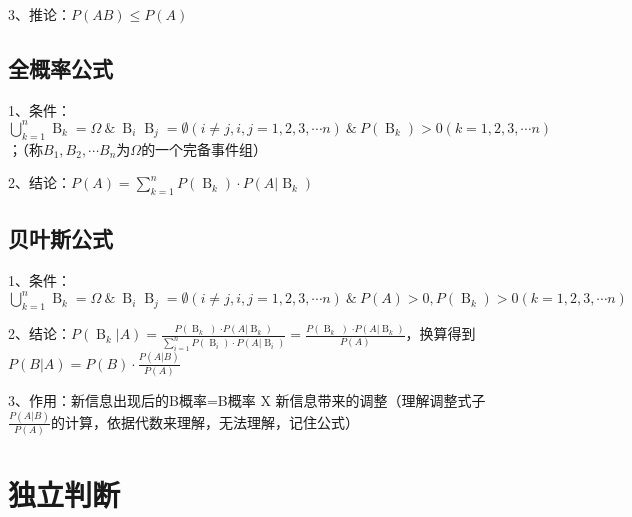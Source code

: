 3、推论：$P(AB) \le P(A)$



\subsection{全概率公式}

1、条件：$\mathop{ \bigcup }\limits_{{k=1}}^{{n}}\mathop{{B}}\nolimits_{{k}}=\Omega \ \& \ \mathop{{B}}\nolimits_{{i}}\mathop{{B}}\nolimits_{{j}}= \emptyset { \left( {i \neq j,i,j=1,2,3, \cdots n} \right) } \ \& \ P{ \left( {\mathop{{B}}\nolimits_{{k}}} \right) } > 0{ \left( {k=1,2,3, \cdots n} \right) }$；（称$B_1,B_2,\cdots B_n$为$\Omega$的一个完备事件组）

2、结论：$P{ \left( {A} \right) }=\mathop{ \sum }\limits_{{k=1}}^{{n}}P{ \left( {\mathop{{B}}\nolimits_{{k}}} \right) } \cdot P{ \left( {A \left| \mathop{{B}}\nolimits_{{k}}\right. } \right) }$



\subsection{贝叶斯公式}

1、条件：$\mathop{ \bigcup }\limits_{{k=1}}^{{n}}\mathop{{B}}\nolimits_{{k}}=\Omega \ \& \ \mathop{{B}}\nolimits_{{i}}\mathop{{B}}\nolimits_{{j}}= \emptyset { \left( {i \neq j,i,j=1,2,3, \cdots n} \right) } \ \& \ P(A) > 0,P{ \left( {\mathop{{B}}\nolimits_{{k}}} \right) } > 0{ \left( {k=1,2,3, \cdots n} \right) }$

2、结论：$P{ \left( {\mathop{{B}}\nolimits_{{k}} \left| A\right. } \right) }=\frac{{P \left( {\mathop{{B}}\nolimits_{{k}}} \left) \cdot P{ \left( {A \left| {\mathop{{B}}\nolimits_{{k}}}\right. } \right) }\right. \right. }}{{\mathop{ \sum }\limits_{{i=1}}^{{n}}P{ \left( {\mathop{{B}}\nolimits_{{i}}} \right) } \cdot P{ \left( {A \left| \mathop{{B}}\nolimits_{{i}}\right. } \right) }}}=\frac{{P \left( {\mathop{{B}}\nolimits_{{k}}} \left) \cdot P{ \left( {A \left| {\mathop{{B}}\nolimits_{{k}}}\right. } \right) }\right. \right. }}{P(A)}$，换算得到$P(B|A)=P(B)\cdot \frac{P(A|B)}{P(A)}$

3、作用：新信息出现后的B概率=B概率 X 新信息带来的调整（理解调整式子$\frac{P(A|B)}{P(A)}$的计算，依据代数来理解，无法理解，记住公式）

\section{独立判断}

